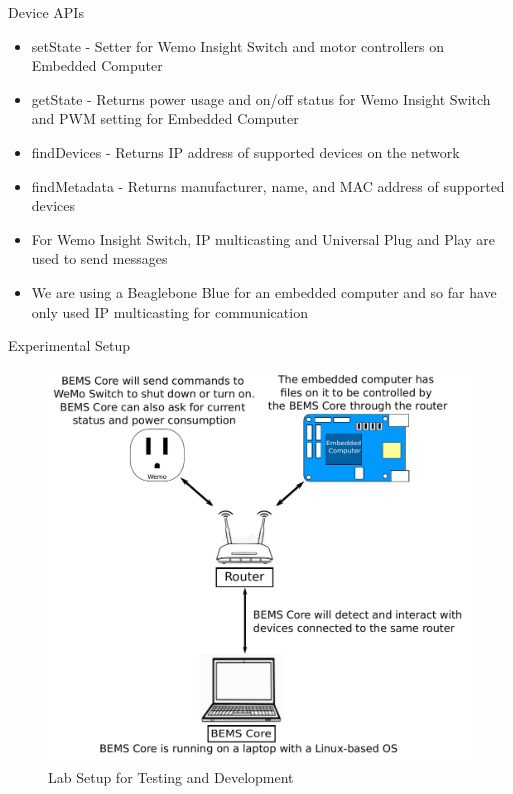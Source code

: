 \documentclass{beamer}
\begin{document}
\begin{frame}{Device APIs}
    \begin{itemize}
        \item setState - Setter for Wemo Insight Switch and motor controllers on Embedded Computer
        \item getState - Returns power usage and on/off status for Wemo Insight Switch and PWM setting for Embedded Computer
        \item findDevices - Returns IP address of supported devices on the network
        \item findMetadata - Returns manufacturer, name, and MAC address of supported devices
        \item For Wemo Insight Switch, IP multicasting and Universal Plug and Play are used to send messages
        \item We are using a Beaglebone Blue for an embedded computer and so far have only used IP multicasting for communication
    \end{itemize}
\end{frame}

\begin{frame}{Experimental Setup}
    \begin{figure}
        \centering
        \includegraphics[scale=0.3]{figs/experimentalSetup.pdf}
        \caption{Lab Setup for Testing and Development}
        \label{fig:my_label}
    \end{figure}
\end{frame}
\end{document}
